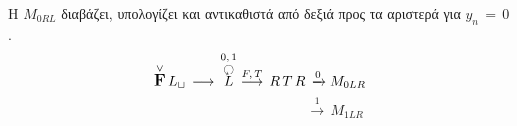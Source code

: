 \par Η $M_{0RL}$ διαβάζει, υπολογίζει και αντικαθιστά από δεξιά προς τα αριστερά για $y_n\,=\,0$.
\reducevspace\reducevspace\reducevspace\reducevspace\reducevspace\reducevspace\reducevspace\reducevspace\reducevspace
\reducevspace\reducevspace\reducevspace\reducevspace\reducevspace\reducevspace\reducevspace\reducevspace\reducevspace
\[\overset{\lor}{{\text{\large\bfseries F}}}\,L_\sqcup\, \longrightarrow\,
\overset{0,\,1}{\overset{\botcircleleft}{L}}
\overset{F,\,T}{\longrightarrow}\, R\,T\,R\,\xrightarrow{0} M_{0LR}\]
\reducevspace\reducevspace\reducevspace\reducevspace\reducevspace\reducevspace\reducevspace
\reducevspace\reducevspace\reducevspace\reducevspace\reducevspace\reducevspace\reducevspace
\reducevspace\reducevspace\reducevspace\reducevspace\reducevspace\reducevspace\reducevspace
\reducevspace\reducevspace\reducevspace\reducevspace\reducevspace\reducevspace\reducevspace
\[\qquad\qquad\qquad\qquad\qquad\;\;\,\xrightarrow{1}\, M_{1LR}\]

